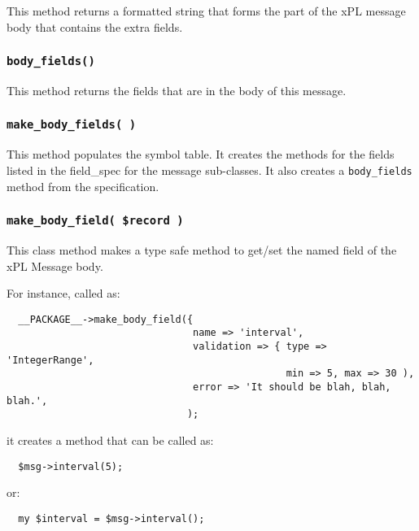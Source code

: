 This method returns a formatted string that forms the part of the xPL
message body that contains the extra fields.

\subsubsection*{\texttt{body\_fields()}\label{xPL::Message_body_fields_}}


This method returns the fields that are in the body of this message.

\subsubsection*{\texttt{make\_body\_fields( )}\label{xPL::Message_make_body_fields_}}


This method populates the symbol table.  It creates the methods for
the fields listed in the \textsf{field\_spec} for the message sub-classes.
It also creates a \texttt{body\_fields} method from the specification.

\subsubsection*{\texttt{make\_body\_field( \$record )}\label{xPL::Message_make_body_field_record_}}


This class method makes a type safe method to get/set the named field
of the xPL Message body.



For instance, called as:

\begin{verbatim}
  __PACKAGE__->make_body_field({
                                name => 'interval',
                                validation => { type => 'IntegerRange',
                                                min => 5, max => 30 ),
                                error => 'It should be blah, blah, blah.',
                               );
\end{verbatim}


it creates a method that can be called as:

\begin{verbatim}
  $msg->interval(5);
\end{verbatim}


or:

\begin{verbatim}
  my $interval = $msg->interval();
\end{verbatim}
